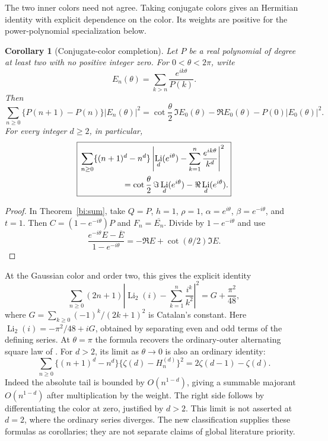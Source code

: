 \documentclass[11pt,letterpaper]{article}
\numberwithin{equation}{section}
\newtheorem{corollary}[theorem]{Corollary}
\theoremstyle{definition}
\theoremstyle{remark}
\DeclareMathOperator{\Li}{Li}
\begin{document}
The two inner colors need not agree. Taking conjugate colors gives an
Hermitian identity with explicit dependence on the color.  Its
weights are positive for the power-polynomial specialization below.

\begin{corollary}[Conjugate-color completion]
\label{bi:hermitian}
Let $P$ be a real polynomial of degree at least two with no positive
integer zero. For $0<\theta<2\pi$, write
\[
 E_n(\theta)=\sum_{k>n}\frac{e^{ik\theta}}{P(k)}.
\]
Then
\begin{equation}\label{bi:hermitian-formula}
 \sum_{n\ge0}\{P(n+1)-P(n)\}|E_n(\theta)|^2
 =\cot\frac\theta2\,\Im E_0(\theta)-\Re E_0(\theta)
                         -P(0)|E_0(\theta)|^2.
\end{equation}
For every integer $d\ge2$, in particular,
\begin{equation}\label{bi:polylog-hermitian}
 \boxed{\begin{aligned}
 &\sum_{n\ge0}\{(n+1)^d-n^d\}
 \left|\Li_d(e^{i\theta})-\sum_{k=1}^n\frac{e^{ik\theta}}{k^d}\right|^2\\
 &\hspace{18mm}=\cot\frac\theta2\,\Im\Li_d(e^{i\theta})
                                  -\Re\Li_d(e^{i\theta}).
 \end{aligned}}
\end{equation}
\end{corollary}

\begin{proof}
In Theorem~\ref{bi:sum}, take $Q=P$, $h=1$, $\rho=1$,
$\alpha=e^{i\theta}$, $\beta=e^{-i\theta}$, and $t=1$.
Then $C=(1-e^{-i\theta})P$ and $F_n=\overline{E_n}$.
Divide by $1-e^{-i\theta}$ and use
\[
 \frac{e^{-i\theta}E-\overline E}{1-e^{-i\theta}}
       =-\Re E+\cot(\theta/2)\Im E.
\]
\end{proof}

At the Gaussian color and order two, this gives the explicit identity
\begin{equation}\label{bi:gaussian-example}
 \boxed{\displaystyle
 \sum_{n\ge0}(2n+1)
 \left|\Li_2(i)-\sum_{k=1}^n\frac{i^k}{k^2}\right|^2
          =G+\frac{\pi^2}{48},}
\end{equation}
where $G=\sum_{k\ge0}(-1)^k/(2k+1)^2$ is Catalan's constant.
Here $\Li_2(i)=-\pi^2/48+iG$, obtained by separating even and odd
terms of the defining series. At $\theta=\pi$ the formula recovers
the ordinary-outer alternating square law of \cite{tail-alternating}.
For $d>2$, its limit as $\theta\to0$ is also an ordinary identity:
\[
 \sum_{n\ge0}\{(n+1)^d-n^d\}
                 \{\zeta(d)-H_n^{(d)}\}^2
            =2\zeta(d-1)-\zeta(d).
\]
Indeed the absolute tail is bounded by $O(n^{1-d})$, giving a
summable majorant $O(n^{1-d})$ after multiplication by the weight.
The right side follows by differentiating the color at zero, justified
by $d>2$. This limit is not asserted at $d=2$, where the ordinary
series diverges. The new classification supplies these formulas as
corollaries; they are not separate claims of global literature priority.
\end{document}
